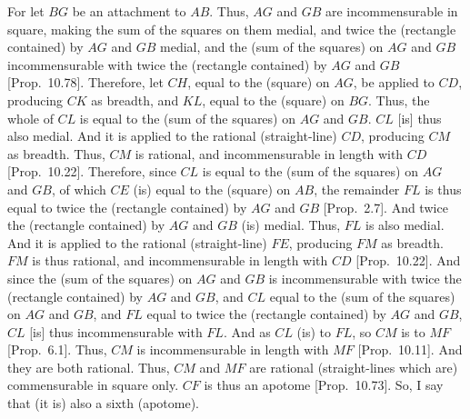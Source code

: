 \begin{Parallel}{}{}
{For let $BG$ be an attachment to $AB$. Thus, $AG$ and $GB$
are incommensurable in square, making the sum of the squares on them
medial, and twice the (rectangle contained) by $AG$ and $GB$ medial,
and the (sum of the squares) on $AG$ and $GB$ incommensurable
with twice the (rectangle contained) by $AG$ and $GB$ [Prop.~10.78]. Therefore, let $CH$, equal to
the (square) on $AG$, be applied to $CD$, producing $CK$
as breadth, and $KL$, equal to the (square) on $BG$. Thus, the whole of
$CL$ is equal to the (sum of the squares) on $AG$ and $GB$. $CL$ [is]
thus also medial. And it is applied to the rational (straight-line) $CD$,
producing $CM$ as breadth. Thus,  $CM$ is rational, and incommensurable
in length with $CD$ [Prop.~10.22]. Therefore,
since $CL$ is equal to the (sum of the squares) on $AG$ and $GB$,
of which $CE$ (is) equal to the (square) on $AB$, the remainder $FL$
is thus equal to twice the (rectangle contained) by $AG$ and $GB$ [Prop.~2.7]. And twice the (rectangle contained)
by  $AG$ and $GB$ (is) medial. Thus, $FL$ is also medial.
And it is applied to the rational (straight-line) $FE$, producing $FM$
as breadth. $FM$ is thus rational, and incommensurable
in length with $CD$ [Prop.~10.22]. 
And since the (sum of the squares) on $AG$ and $GB$ is incommensurable
with twice the (rectangle contained) by $AG$ and $GB$, and $CL$ equal to the
(sum of the squares) on $AG$ and $GB$, and $FL$ equal to twice the
(rectangle contained) by $AG$ and $GB$, $CL$ [is] thus
incommensurable with $FL$. And as $CL$ (is) to $FL$, so $CM$ is
to $MF$ [Prop.~6.1]. Thus, $CM$ is incommensurable
in length with $MF$ [Prop.~10.11]. And they
are both rational. Thus, $CM$ and $MF$ are rational (straight-lines which are) commensurable in square only. $CF$ is thus an apotome [Prop.~10.73]. So, I say that (it is) also a
sixth (apotome).

}
\end{Parallel}

